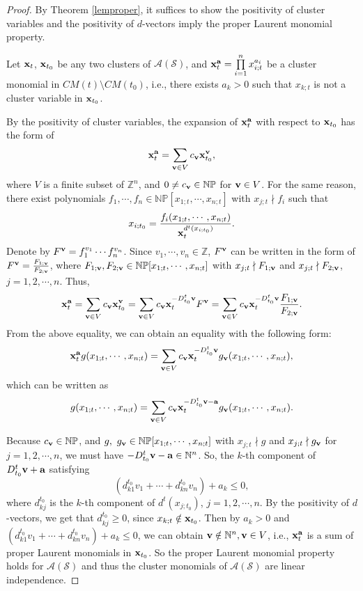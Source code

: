 \documentclass[14pt]{amsart}
\begin{document}
\begin{proof}
By Theorem \ref{lemproper}, it suffices to show the positivity of cluster variables and the positivity of $d$-vectors imply the proper Laurent monomial property.


Let ${\bf x}_t$, ${\bf x}_{t_0}$ be any two clusters of $\mathcal A(\mathcal S)$, and ${\bf x}_t^{\bf a}=\prod\limits_{i=1}^{n}x_{i;t}^{a_i}$ be a cluster monomial in $CM(t)\setminus CM(t_0)$, i.e.,  there exists $a_k>0$ such that $x_{k;t}$
is not a cluster variable in ${\bf x}_{t_0}$.

By the positivity of cluster variables, the expansion of ${\bf x}_t^{\bf a}$ with respect to ${\bf x}_{t_0}$ has the form of
\begin{eqnarray}
{\bf x}_t^{\bf a}=\sum\limits_{{\bf v}\in V} c_{\bf v}{\bf x}_{t_0}^{\bf v},\nonumber
 \end{eqnarray}
 where $V$ is a finite subset of $\mathbb Z^n$, and $0\neq c_{\bf v}\in\mathbb {NP}$ for  ${\bf v}\in V$.
  For the same reason, there exist polynomials $f_1,\cdots,f_n\in \mathbb {NP}[x_{1;t},\cdots,x_{n;t}]$ with $x_{j;t}\nmid f_i$ such that
 $$x_{i;t_0}=\frac{f_i(x_{1;t},\cdots,x_{n;t})}{{\bf x}_t^{d^t(x_{i;t_0})}}.$$
Denote by $F^{\bf v}=f_1^{v_1}\cdots f_n^{v_n}$.  Since $v_1,\cdots,v_n\in \mathbb Z$, $F^{\bf v}$ can be written in  the form of $F^{\bf v}=\frac{F_{1;{\bf v}}}{F_{2;{\bf v}}}$, where
$F_{1;{\bf v}}, F_{2;{\bf v}}\in \mathbb {NP}[x_{1;t},\cdots,x_{n;t}]$  with $x_{j;t}\nmid F_{1;{\bf v}}$ and $x_{j;t}\nmid F_{2;{\bf v}}$, $j=1,2,\cdots,n$.
 Thus, $${\bf x}_t^{\bf a}=\sum\limits_{{\bf v}\in V} c_{\bf v}{\bf x}_{t_0}^{\bf v}=
\sum\limits_{{\bf v}\in V} c_{\bf v}{\bf x}_{t}^{-D_{t_0}^{t}\bf v}F^{\bf v}=\sum\limits_{{\bf v}\in V} c_{\bf v}{\bf x}_{t}^{-D_{t_0}^{t}\bf v}\frac{F_{1;{\bf v}}}{F_{2;{\bf v}}}.$$
 From the above equality, we can obtain an equality with the following form:
 $$
{\bf x}_t^{\bf a}g(x_{1;t},\cdots,x_{n;t})=\sum\limits_{{\bf v}\in V} c_{\bf v}{\bf x}_{t}^{-D_{t_0}^{t}{\bf v}}g_{\bf v}(x_{1;t},\cdots,x_{n;t}),
$$
which can be written as
$$g(x_{1;t},\cdots,x_{n;t})=\sum\limits_{{\bf v}\in V} c_{\bf v}{\bf x}_{t}^{-D_{t_0}^{t}{\bf v}-{\bf a}}g_{\bf v}(x_{1;t},\cdots,x_{n;t}).$$

Because $c_{\bf v}\in\mathbb {NP}$, and $g,~g_{\bf v}\in \mathbb {NP}[x_{1;t},\cdots,x_{n;t}]$ with $x_{j;t}\nmid g$ and $x_{j;t}\nmid g_{\bf v}$ for $j=1,2,\cdots,n$, we must have $-D_{t_0}^{t}{\bf v}-{\bf a}\in\mathbb N^n$. So, the $k$-th component of  $D_{t_0}^{t}{\bf v}+{\bf a}$ satisfying $$(d_{k1}^{t_0}v_1+\cdots+d_{kn}^{t_0}v_n)+a_k\leq0,$$ where $d_{kj}^{t_0}$ is the $k$-th component of $d^t(x_{j;t_0})$, $j=1,2,\cdots,n$. By the positivity of $d$-vectors, we get that $d_{kj}^{t_0}\geq 0$, since $x_{k;t}\notin {\bf x}_{t_0}$. Then by $a_k>0$ and $(d_{k1}^{t_0}v_1+\cdots+d_{kn}^{t_0}v_n)+a_k\leq0$, we can obtain ${\bf v}\notin \mathbb N^n, {\bf v}\in V$, i.e.,
${\bf x}_t^{\bf a}$ is a sum of proper Laurent monomials in ${\bf x}_{t_0}$. So the  proper Laurent monomial property holds for $\mathcal A(\mathcal S)$ and thus the cluster monomials of $\mathcal A(\mathcal S)$ are linear independence.
\end{proof}
\end{document}

